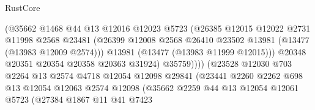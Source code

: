 \begin{lexlean}{RustCore}
\begin{coremodule}
                                    (@35662
                                      @1468
                                      @44
                                      @13
                                      @12016
                                      @12023
                                      @5723
                                      (@26385
                                        @12015
                                        @12022
                                        @2731
                                        @11998
                                        @2568
                                        @23481
                                        (@26399
                                          @12008
                                          @2568
                                          @26410
                                          @23502
                                          @13981
                                          (@13477 (@13983 @12009 @2574)))
                                        @13981
                                        (@13477 (@13983 @11999 @12015)))
                                      @20348
                                      @20351
                                      @20354
                                      @20358
                                      @20363
                                      @31924)
                                    @35759))))
                            (@23528
                              @12030
                              @703
                              @2264
                              @13
                              @2574
                              @4718
                              @12054
                              @12098
                              @29841
                              (@23441
                                @2260
                                @2262
                                @698
                                @13
                                @12054
                                @12063
                                @2574
                                @12098
                                (@35662
                                  @2259
                                  @44
                                  @13
                                  @12054
                                  @12061
                                  @5723
                                  (@27384
                                    @1867
                                    @11
                                    @41
                                    @7423

\end{coremodule}
\end{lexlean}
